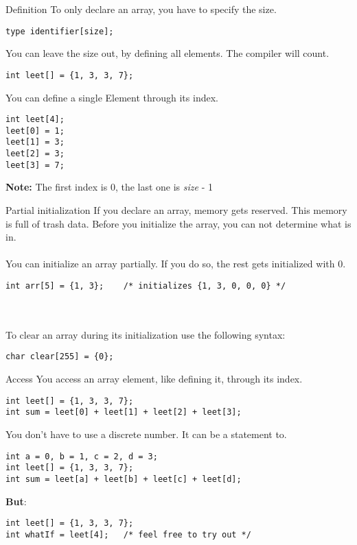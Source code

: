 \begin{frame}[fragile]{Definition}
	To only declare an array, you have to specify the size.
	\begin{lstlisting}[numbers=none, basicstyle=\itshape\small]
type identifier[size];
\end{lstlisting}
	You can leave the size out, by defining all elements. The compiler will count.
	\begin{lstlisting}[numbers=none]
int leet[] = {1, 3, 3, 7};
\end{lstlisting}
	You can define a single Element through its index.
	\begin{lstlisting}[numbers=none]
int leet[4];
leet[0] = 1;
leet[1] = 3;
leet[2] = 3;
leet[3] = 7;
\end{lstlisting}
	\textbf{Note:} The first index is 0, the last one is \textit{size} - 1
\end{frame}
\begin{frame}[fragile]{Partial initialization}
	If you declare an array, memory gets reserved. This memory is full of trash data. Before you initialize the array, you can not determine what is in.\\
	\ \\
	You can initialize an array partially. If you do so, the rest gets initialized with 0.
	\begin{lstlisting}[numbers=none]
int arr[5] = {1, 3};	/* initializes {1, 3, 0, 0, 0} */
\end{lstlisting}\ \\\ \\
	To clear an array during its initialization use the following syntax:
	\begin{lstlisting}[numbers=none]
char clear[255] = {0};
\end{lstlisting}
\end{frame}
\begin{frame}[fragile]{Access}
	You access an array element, like defining it, through its index.
	\begin{lstlisting}[numbers=none]
int leet[] = {1, 3, 3, 7};
int sum = leet[0] + leet[1] + leet[2] + leet[3];
\end{lstlisting}
	You don't have to use a discrete number. It can be a statement to.
	\begin{lstlisting}[numbers=none]
int a = 0, b = 1, c = 2, d = 3;
int leet[] = {1, 3, 3, 7};
int sum = leet[a] + leet[b] + leet[c] + leet[d];
\end{lstlisting}
	\textbf{But}:
	\begin{lstlisting}[numbers=none]
int leet[] = {1, 3, 3, 7};
int whatIf = leet[4];	/* feel free to try out */
\end{lstlisting}
\end{frame}
